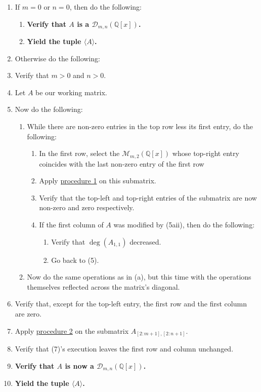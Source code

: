 \documentclass[twocolumn]{article}
\begin{document}
				\begin{enumerate}
					\item If $m=0$ or $n=0$, then do the following:
					\begin{enumerate}
						\item \textbf{Verify that $A$ is a $\mathcal{D}_{m,n}(\mathbb{Q}[x])$.}
						\item \textbf{Yield the tuple $\langle A\rangle$.}
					\end{enumerate}
					\item Otherwise do the following:
					\item Verify that $m>0$ and $n>0$.
					\item Let $A$ be our working matrix.
					\item Now do the following:
						\begin{enumerate}
						\item While there are non-zero entries in the top row less its first entry, do the following:
						\begin{enumerate}
							\item In the first row, select the $\mathcal{M}_{m,2}(\mathbb{Q}[x])$ whose top-right entry coincides with the last non-zero entry of the first row
							\item Apply \hyperref[sec:procedure 1]{procedure 1} on this submatrix.
							\item Verify that the top-left and top-right entries of the submatrix are now non-zero and zero respectively.
							\item If the first column of $A$ was modified by (5aii), then do the following:
							\begin{enumerate}
								\item Verify that $\deg(A_{1,1})$ decreased.
								\item Go back to (5).
							\end{enumerate}
						\end{enumerate}
						\item Now do the same operations as in (a), but this time with the operations themselves reflected across the matrix's diagonal.
					\end{enumerate}
					\item Verify that, except for the top-left entry, the first row and the first column are zero.
					\item Apply \hyperref[sec:procedure 2]{procedure 2} on the submatrix $A_{[2:m+1],[2:n+1]}$.
					\item Verify that (7)'s execution leaves the first row and column unchanged.
					\item \textbf{Verify that $A$ is now a $\mathcal{D}_{m,n}(\mathbb{Q}[x])$.}
					\item \textbf{Yield the tuple $\langle A\rangle$.}
				\end{enumerate}
\end{document}
